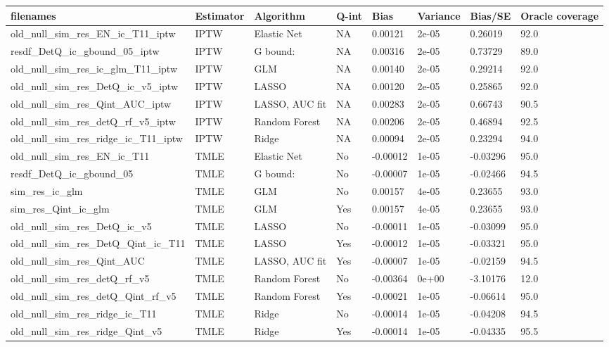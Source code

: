
\begin{longtable}[l]{llllllll}
\toprule
filenames & Estimator & Algorithm & Q-int & Bias & Variance & Bias/SE & Oracle coverage\\
\midrule
old\_null\_sim\_res\_EN\_ic\_T11\_iptw & IPTW & Elastic Net & NA & 0.00121 & 2e-05 & 0.26019 & 92.0\\
resdf\_DetQ\_ic\_gbound\_05\_iptw & IPTW & G bound: & NA & 0.00316 & 2e-05 & 0.73729 & 89.0\\
old\_null\_sim\_res\_ic\_glm\_T11\_iptw & IPTW & GLM & NA & 0.00140 & 2e-05 & 0.29214 & 92.0\\
old\_null\_sim\_res\_DetQ\_ic\_v5\_iptw & IPTW & LASSO & NA & 0.00120 & 2e-05 & 0.25865 & 92.0\\
old\_null\_sim\_res\_Qint\_AUC\_iptw & IPTW & LASSO, AUC fit & NA & 0.00283 & 2e-05 & 0.66743 & 90.5\\
old\_null\_sim\_res\_detQ\_rf\_v5\_iptw & IPTW & Random Forest & NA & 0.00206 & 2e-05 & 0.46894 & 92.5\\
old\_null\_sim\_res\_ridge\_ic\_T11\_iptw & IPTW & Ridge & NA & 0.00094 & 2e-05 & 0.23294 & 94.0\\
old\_null\_sim\_res\_EN\_ic\_T11 & TMLE & Elastic Net & No & -0.00012 & 1e-05 & -0.03296 & 95.0\\
resdf\_DetQ\_ic\_gbound\_05 & TMLE & G bound: & No & -0.00007 & 1e-05 & -0.02466 & 94.5\\
sim\_res\_ic\_glm & TMLE & GLM & No & 0.00157 & 4e-05 & 0.23655 & 93.0\\
sim\_res\_Qint\_ic\_glm & TMLE & GLM & Yes & 0.00157 & 4e-05 & 0.23655 & 93.0\\
old\_null\_sim\_res\_DetQ\_ic\_v5 & TMLE & LASSO & No & -0.00011 & 1e-05 & -0.03099 & 95.0\\
old\_null\_sim\_res\_DetQ\_Qint\_ic\_T11 & TMLE & LASSO & Yes & -0.00012 & 1e-05 & -0.03321 & 95.0\\
old\_null\_sim\_res\_Qint\_AUC & TMLE & LASSO, AUC fit & Yes & -0.00007 & 1e-05 & -0.02159 & 94.5\\
old\_null\_sim\_res\_detQ\_rf\_v5 & TMLE & Random Forest & No & -0.00364 & 0e+00 & -3.10176 & 12.0\\
old\_null\_sim\_res\_detQ\_Qint\_rf\_v5 & TMLE & Random Forest & Yes & -0.00021 & 1e-05 & -0.06614 & 95.0\\
old\_null\_sim\_res\_ridge\_ic\_T11 & TMLE & Ridge & No & -0.00014 & 1e-05 & -0.04208 & 94.5\\
old\_null\_sim\_res\_ridge\_Qint\_v5 & TMLE & Ridge & Yes & -0.00014 & 1e-05 & -0.04335 & 95.5\\
\bottomrule
\end{longtable}
